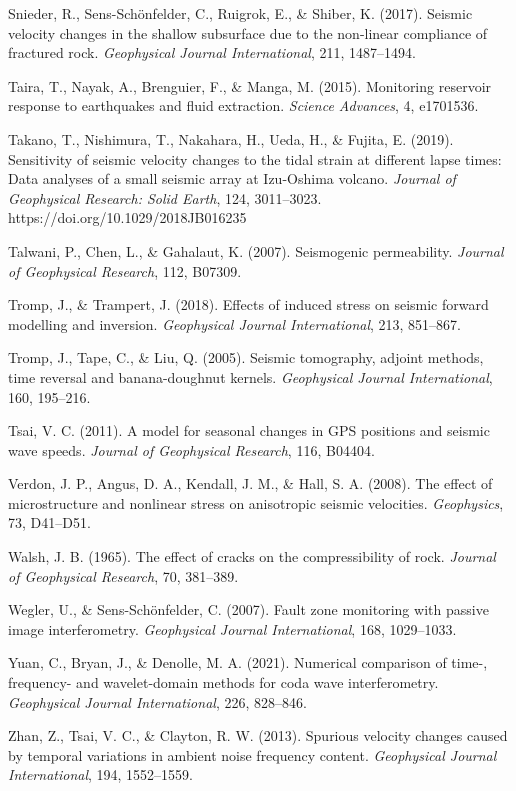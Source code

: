 \documentclass[12pt]{article}
\begin{document}
Snieder, R., Sens-Schönfelder, C., Ruigrok, E., \& Shiber, K. (2017).
Seismic velocity changes in the shallow subsurface due to the non-linear
compliance of fractured rock. \emph{Geophysical Journal International},
211, 1487--1494.

Taira, T., Nayak, A., Brenguier, F., \& Manga, M. (2015). Monitoring
reservoir response to earthquakes and fluid extraction. \emph{Science
Advances}, 4, e1701536.

Takano, T., Nishimura, T., Nakahara, H., Ueda, H., \& Fujita, E. (2019).
Sensitivity of seismic velocity changes to the tidal strain at different
lapse times: Data analyses of a small seismic array at Izu-Oshima
volcano. \emph{Journal of Geophysical Research: Solid Earth}, 124,
3011--3023. https://doi.org/10.1029/2018JB016235

Talwani, P., Chen, L., \& Gahalaut, K. (2007). Seismogenic permeability.
\emph{Journal of Geophysical Research}, 112, B07309.

Tromp, J., \& Trampert, J. (2018). Effects of induced stress on seismic
forward modelling and inversion. \emph{Geophysical Journal
International}, 213, 851--867.

Tromp, J., Tape, C., \& Liu, Q. (2005). Seismic tomography, adjoint
methods, time reversal and banana-doughnut kernels. \emph{Geophysical
Journal International}, 160, 195--216.

Tsai, V. C. (2011). A model for seasonal changes in GPS positions and
seismic wave speeds. \emph{Journal of Geophysical Research}, 116,
B04404.

Verdon, J. P., Angus, D. A., Kendall, J. M., \& Hall, S. A. (2008). The
effect of microstructure and nonlinear stress on anisotropic seismic
velocities. \emph{Geophysics}, 73, D41--D51.

Walsh, J. B. (1965). The effect of cracks on the compressibility of
rock. \emph{Journal of Geophysical Research}, 70, 381--389.

Wegler, U., \& Sens-Schönfelder, C. (2007). Fault zone monitoring with
passive image interferometry. \emph{Geophysical Journal International},
168, 1029--1033.

Yuan, C., Bryan, J., \& Denolle, M. A. (2021). Numerical comparison of
time-, frequency- and wavelet-domain methods for coda wave
interferometry. \emph{Geophysical Journal International}, 226, 828--846.

Zhan, Z., Tsai, V. C., \& Clayton, R. W. (2013). Spurious velocity
changes caused by temporal variations in ambient noise frequency
content. \emph{Geophysical Journal International}, 194, 1552--1559.
\end{document}

